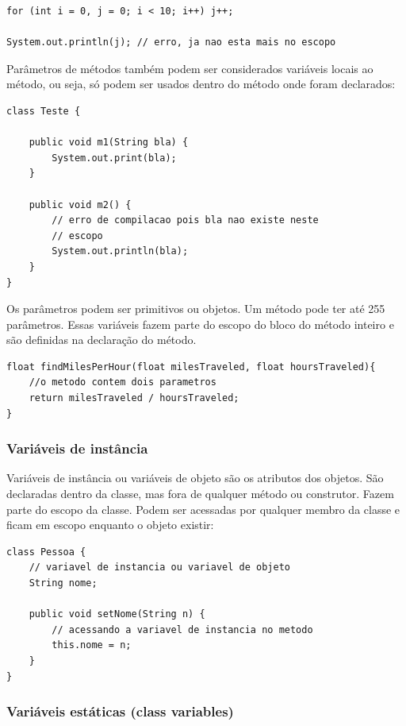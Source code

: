 \documentclass[12pt]{article}
\begin{document}
\begin{lstlisting}
for (int i = 0, j = 0; i < 10; i++) j++;

System.out.println(j); // erro, ja nao esta mais no escopo
\end{lstlisting}

Parâmetros de métodos também podem ser considerados variáveis locais ao método, ou seja, só podem ser usados dentro do método onde foram declarados:

\begin{lstlisting}
class Teste {
	
	public void m1(String bla) {
		System.out.print(bla);
	}
	
	public void m2() {
		// erro de compilacao pois bla nao existe neste
		// escopo
		System.out.println(bla);
	}
}
\end{lstlisting}

Os parâmetros podem ser primitivos ou objetos. Um método pode ter até 255 parâmetros. Essas variáveis fazem parte do escopo do bloco do método inteiro e são definidas na declaração do método.
\pagebreak

\begin{lstlisting}
float findMilesPerHour(float milesTraveled, float hoursTraveled){
	//o metodo contem dois parametros
	return milesTraveled / hoursTraveled;
}
\end{lstlisting}

\subsubsection{Variáveis de instância}

Variáveis de instância ou variáveis de objeto são os atributos dos objetos. São declaradas dentro da classe, mas fora de qualquer método ou construtor. Fazem parte do escopo da classe. Podem ser acessadas por qualquer membro da classe e ficam em escopo enquanto o objeto existir:

\begin{lstlisting}
class Pessoa {
	// variavel de instancia ou variavel de objeto
	String nome;
	
	public void setNome(String n) {
		// acessando a variavel de instancia no metodo
		this.nome = n;
	}
}
\end{lstlisting}

\subsubsection{Variáveis estáticas (class variables)}
\end{document}

